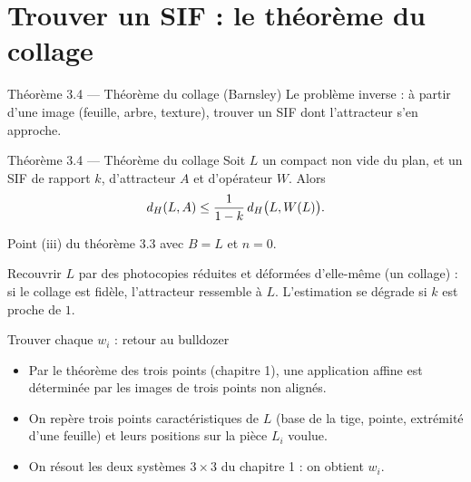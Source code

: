 \section{Trouver un SIF : le théorème du collage}

\begin{frame}{Théorème 3.4 --- Théorème du collage (Barnsley)}
  \small Le problème inverse : à partir d'une image (feuille, arbre,
  texture), trouver un SIF dont l'attracteur s'en approche.
  \begin{Enonce}{Théorème 3.4 --- Théorème du collage}
    Soit $L$ un compact non vide du plan, et un SIF de rapport $k$,
    d'attracteur $A$ et d'opérateur $W$. Alors
    \[
      d_H(L,A)\leq\frac{1}{1-k}\,d_H\big(L,W(L)\big).
    \]
  \end{Enonce}
  \begin{AuTableau}
    \small Point (iii) du théorème 3.3 avec $B=L$ et $n=0$.
  \end{AuTableau}
  \small Recouvrir $L$ par des photocopies réduites et déformées
  d'elle-même (un collage) : si le collage est fidèle, l'attracteur
  ressemble à $L$. L'estimation se dégrade si $k$ est proche de $1$.
\end{frame}

\begin{frame}{Trouver chaque $w_i$ : retour au bulldozer}
  \small
  \begin{itemize}
    \item Par le théorème des trois points (chapitre 1), une application
      affine est déterminée par les images de trois points non alignés.
    \item On repère trois points caractéristiques de $L$ (base de la
      tige, pointe, extrémité d'une feuille) et leurs positions sur la
      pièce $L_i$ voulue.
    \item On résout les deux systèmes $3\times3$ du chapitre 1 : on
      obtient $w_i$.
  \end{itemize}
\end{frame}

